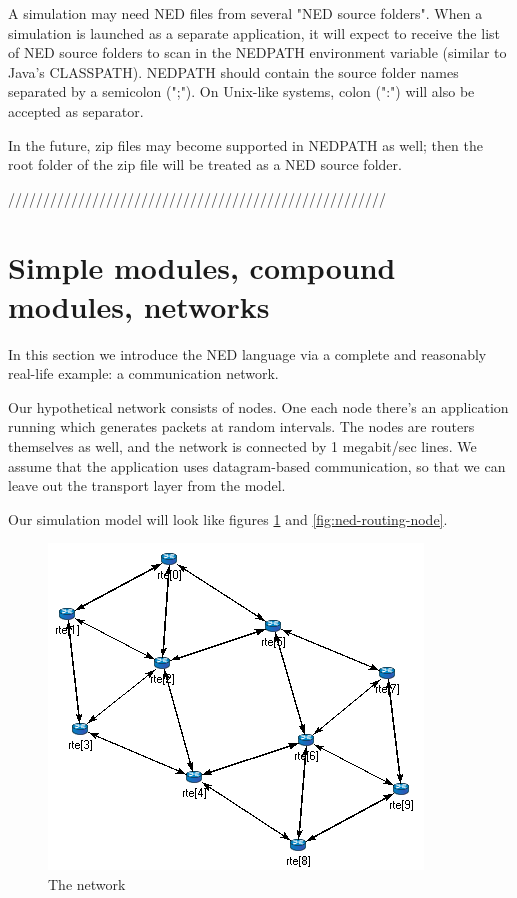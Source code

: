 A simulation may need NED files from several "NED source folders".
When a simulation is launched as a separate application, it will expect
to receive the list of NED source folders to scan in the NEDPATH
environment variable (similar to Java's CLASSPATH). NEDPATH should
contain the source folder names separated by a semicolon (";").
On Unix-like systems, colon (":") will also be accepted as separator.

In the future, zip files may become supported in NEDPATH as well;
then the root folder of the zip file will be treated as a NED source
folder.

\bigskip
\bigskip
//////////////////////////////////////////////////////
\bigskip
\bigskip

\section{Simple modules, compound modules, networks}

In this section we introduce the NED language via a complete and
reasonably real-life example: a communication network.

Our hypothetical network consists of nodes. One each node there's an
application running which generates packets at random intervals.
The nodes are routers themselves as well, and the network is connected
by 1 megabit/sec lines. We assume that the application uses datagram-based
communication, so that we can leave out the transport layer from the model.

Our simulation model will look like figures \ref{fig:ned-routing-network}
and \ref{fig:ned-routing-node}.

\begin{figure}[htbp]
  \begin{center}
    \includegraphics[scale=0.6]{figures/ned-routing-network}
    \caption{The network}
    \label{fig:ned-routing-network}
  \end{center}
\end{figure}

